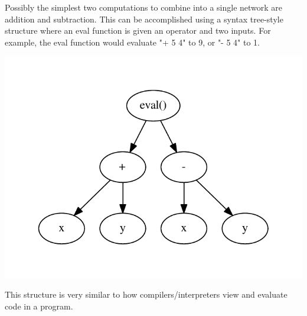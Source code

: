 \documentclass[./Research.tex]{subfiles}
\begin{document}
Possibly the simplest two computations to combine into a single network are addition and subtraction. This can be accomplished using a syntax tree-style structure where an eval function is given an operator and two inputs. For example, the eval function would evaluate "+ 5 4" to 9, or "- 5 4" to 1.

\includegraphics{Visuals/NeuralNetwork_1_SyntaxTree.pdf}

This structure is very similar to how compilers/interpreters view and evaluate code in a program.
\end{document}
